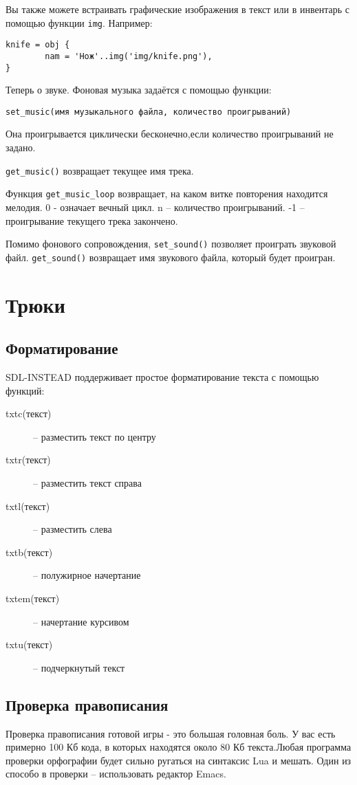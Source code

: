 \documentclass[a4paper,12pt]{article}
\begin{document}
Вы также можете встраивать графические изображения в текст или в инвентарь с помощью функции \verb/img/. Например:

\begin{verbatim}
knife = obj {
        nam = 'Нож'..img('img/knife.png'),
}
\end{verbatim}

Теперь о звуке. Фоновая музыка задаётся с помощью функции: 

\begin{verbatim}
set_music(имя музыкального файла, количество проигрываний)
\end{verbatim}

Она проигрывается циклически бесконечно,если количество проигрываний не задано.

\verb/get_music()/ возвращает текущее имя трека.

Функция \verb/get_music_loop/ возвращает, на каком витке повторения находится мелодия. 0 - означает вечный цикл. n -- количество проигрываний. -1 -- проигрывание текущего трека закончено.

Помимо фонового сопровождения, \verb/set_sound()/ позволяет проиграть звуковой файл. \verb/get_sound()/ возвращает имя звукового файла, который будет проигран.

\section{Трюки}
\subsection{Форматирование}
SDL-INSTEAD поддерживает простое форматирование текста с помощью функций:

\begin{description}
\item[txtc(текст)] -- разместить текст по центру
\item[txtr(текст)] -- разместить текст справа
\item[txtl(текст)] -- разместить слева
\item[txtb(текст)] -- полужирное начертание
\item[txtem(текст)] -- начертание курсивом
\item[txtu(текст)] -- подчеркнутый текст
\end{description}

\subsection{Проверка правописания}
Проверка правописания готовой игры - это большая головная боль. У вас есть примерно 100 Кб кода, в которых находятся около 80 Кб текста.Любая программа проверки орфографии будет сильно ругаться на синтаксис Lua и мешать. Один из способо в проверки -- использовать редактор Emacs.
\end{document}
